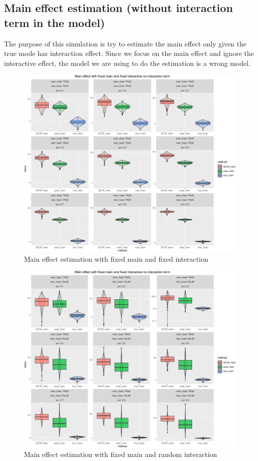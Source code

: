 \documentclass[]{article}
\begin{document}
\newpage 

\subsection{Main effect estimation (without interaction term in the
model)}\label{main-effect-estimation-without-interaction-term-in-the-model}

The purpose of this simulation is try to estimate the main effect only
given the true mode has interaction effect. Since we focus on the main
effect and ignore the interactive effect, the model we are using to do
the estimation is a wrong model.

\begin{figure}
\centering
\includegraphics{Simulation_report_files/figure-latex/main effect fixed fixed without inter-1.pdf}
\caption{Main effect estimation with fixed main and fixed interaction}
\end{figure}

\begin{figure}
\centering
\includegraphics{Simulation_report_files/figure-latex/main effect fixed random without inter-1.pdf}
\caption{Main effect estimation with fixed main and random interaction}
\end{figure}
\end{document}
